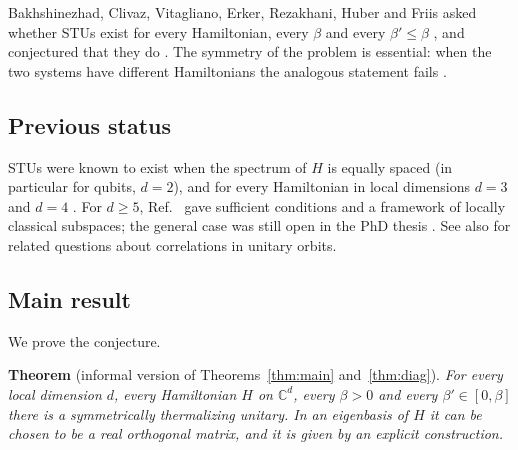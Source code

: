 \documentclass[11pt]{amsart}
\theoremstyle{definition}
\theoremstyle{remark}
\numberwithin{equation}{section}
\newcommand{\C}{\mathbb{C}}
\begin{document}
Bakhshinezhad, Clivaz, Vitagliano, Erker, Rezakhani, Huber and Friis asked whether STUs exist for
every Hamiltonian, every $\beta$ and every $\beta'\le\beta$ \cite[Question~2]{BakhshinezhadEtAl2019},
and conjectured that they do \cite[Sec.~IV]{BakhshinezhadEtAl2019}. The symmetry of the problem is
essential: when the two systems have different Hamiltonians the analogous statement fails
\cite[Sec.~II.1.1]{BakhshinezhadEtAl2019}.

\subsection{Previous status}
STUs were known to exist when the spectrum of $H$ is equally spaced \cite{HuberEtAl2015} (in
particular for qubits, $d=2$), and for every Hamiltonian in local dimensions $d=3$ and $d=4$
\cite{BakhshinezhadEtAl2019}. For $d\ge5$, Ref.~\cite{BakhshinezhadEtAl2019} gave sufficient
conditions and a framework of locally classical subspaces; the general case was still open in the
PhD thesis \cite{Clivaz2020}. See also \cite{JevticJenningsRudolph2012,McKayEtAl2018} for related
questions about correlations in unitary orbits.

\subsection{Main result}
We prove the conjecture.

\medskip
\noindent\textbf{Theorem} (informal version of Theorems~\ref{thm:main} and~\ref{thm:diag}).
\emph{For every local dimension $d$, every Hamiltonian $H$ on $\C^d$, every $\beta>0$ and every
$\beta'\in[0,\beta]$ there is a symmetrically thermalizing unitary. In an eigenbasis of $H$ it can be
chosen to be a real orthogonal matrix, and it is given by an explicit construction.}
\medskip
\end{document}
